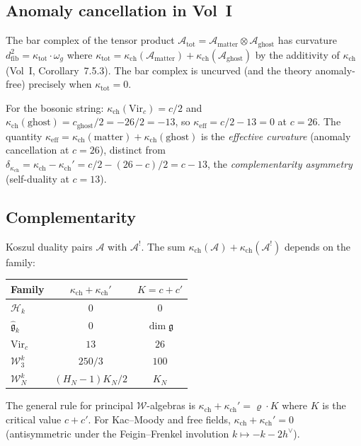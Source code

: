 \documentclass[11pt]{article}
\theoremstyle{definition}
\theoremstyle{remark}
\begin{document}
\subsection{Anomaly cancellation in Vol~I}

The bar complex of the tensor product
$\mathcal{A}_{\mathrm{tot}} = \mathcal{A}_{\mathrm{matter}} \otimes
\mathcal{A}_{\mathrm{ghost}}$ has curvature
$d_{\mathrm{fib}}^2 = \kappa_{\mathrm{tot}} \cdot \omega_g$ where
$\kappa_{\mathrm{tot}} = \kappa_{\mathrm{ch}}(\mathcal{A}_{\mathrm{matter}})
+ \kappa_{\mathrm{ch}}(\mathcal{A}_{\mathrm{ghost}})$
by the additivity of $\kappa_{\mathrm{ch}}$ (Vol~I, Corollary~7.5.3).
The bar complex is uncurved (and the theory anomaly-free) precisely
when $\kappa_{\mathrm{tot}} = 0$.

For the bosonic string: $\kappa_{\mathrm{ch}}(\mathrm{Vir}_c) = c/2$ and
$\kappa_{\mathrm{ch}}(\mathrm{ghost}) = c_{\mathrm{ghost}}/2 = -26/2 = -13$, so
$\kappa_{\mathrm{eff}} = c/2 - 13 = 0$ at $c = 26$. The quantity
$\kappa_{\mathrm{eff}} = \kappa_{\mathrm{ch}}(\mathrm{matter}) + \kappa_{\mathrm{ch}}(\mathrm{ghost})$
is the \emph{effective curvature} (anomaly cancellation at $c = 26$), distinct
from $\delta_{\kappa_{\mathrm{ch}}} = \kappa_{\mathrm{ch}} - \kappa_{\mathrm{ch}}' = c/2 - (26-c)/2 = c - 13$, the
\emph{complementarity asymmetry} (self-duality at $c = 13$).

\subsection{Complementarity}

Koszul duality pairs $\mathcal{A}$ with $\mathcal{A}^!$. The sum
$\kappa_{\mathrm{ch}}(\mathcal{A}) + \kappa_{\mathrm{ch}}(\mathcal{A}^!)$ depends on the family:
\begin{center}
\begin{tabular}{lcc}
\textbf{Family} & $\kappa_{\mathrm{ch}} + \kappa_{\mathrm{ch}}'$ & $K = c + c'$ \\ \hline
$\mathcal{H}_k$ & $0$ & $0$ \\
$\widehat{\mathfrak{g}}_k$ & $0$ & $\dim\mathfrak{g}$ \\
$\mathrm{Vir}_c$ & $13$ & $26$ \\
$\mathcal{W}_3^k$ & $250/3$ & $100$ \\
$\mathcal{W}_N^k$ & $(H_N - 1) K_N / 2$ & $K_N$
\end{tabular}
\end{center}
The general rule for principal $\mathcal{W}$-algebras is
$\kappa_{\mathrm{ch}} + \kappa_{\mathrm{ch}}' = \varrho \cdot K$ where $K$ is the critical value
$c + c'$. For Kac--Moody and free fields, $\kappa_{\mathrm{ch}} + \kappa_{\mathrm{ch}}' = 0$
(antisymmetric under the Feigin--Frenkel involution
$k \mapsto -k - 2h^\vee$).
\end{document}
